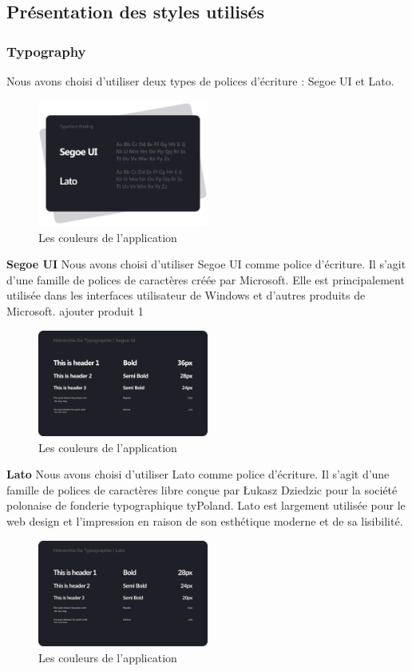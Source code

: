 \documentclass[edit,12pt,a4paper,ChapStyle,oneside,doubleinterligne]{report}
\begin{document}
\subsection{Présentation des styles utilisés }
\subsubsection{Typography}
Nous avons choisi d'utiliser deux types de polices d'écriture : Segoe UI et Lato.
\begin{figure} [H]
    \centering
    \includegraphics[width=0.5\textwidth]{images/Typography.png}
    \caption{Les couleurs de l'application}
    \label{fig:colors}
\end{figure}
\textbf{Segoe UI}\newline
Nous avons choisi d'utiliser Segoe UI comme police d'écriture. Il s'agit d'une famille de polices de caractères créée par Microsoft. Elle est principalement utilisée dans les interfaces utilisateur de Windows et d'autres produits de Microsoft.
ajouter produit 1
\begin{figure} [H]
    \centering
    \includegraphics[width=0.5\textwidth]{images/Segoe UI.jpg}
    \caption{Les couleurs de l'application}
    \label{fig:colors}
\end{figure}
\textbf{Lato}
Nous avons choisi d'utiliser Lato comme police d'écriture. Il s'agit d'une famille de polices de caractères libre conçue par Łukasz Dziedzic pour la société polonaise de fonderie typographique tyPoland. Lato est largement utilisée pour le web design et l'impression en raison de son esthétique moderne et de sa lisibilité.
\begin{figure} [H]
    \centering
    \includegraphics[width=0.5\textwidth]{images/lato.jpg}
    \caption{Les couleurs de l'application}
    \label{fig:colors}
\end{figure}
\end{document}
